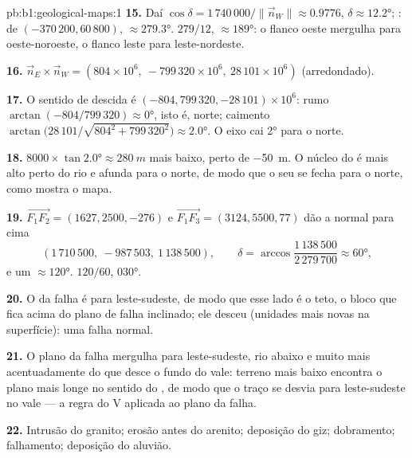 \begin{solution}{pb:b1:geological-maps:1}
\textbf{15.} Daí $\cos\delta = 1\,740\,000/\|\vec n_W\| \approx 0.9776$, $\delta
\approx \ang{12.2}$; :  de $(-370\,200, 60\,800)$,
$\approx \ang{279.3}$.  $279/12$,  $\approx \ang{189}$: o flanco oeste mergulha para oeste-noroeste, o flanco leste para leste-nordeste.

\textbf{16.} $\vec n_E \times \vec n_W = (804 \times 10^6,\ -799\,320 \times
10^6,\ 28\,101 \times 10^6)$ (arredondado).

\textbf{17.} O sentido de descida é $(-804, 799\,320, -28\,101) \times
10^6$: rumo $\arctan(-804/799\,320) \approx \ang{0}$, isto é, norte; caimento
$\arctan\bigl(28\,101/\sqrt{804^2 + 799\,320^2}\bigr) \approx \ang{2.0}$. O
eixo cai \ang{2} para o norte.

\textbf{18.} $8000 \times \tan\ang{2.0} \approx \qty{280}{m}$ mais baixo, perto de
\qty{-50}{m}. O núcleo do  é mais alto perto do rio e afunda para o norte, de modo que o seu  se fecha para o norte, como mostra o mapa.

\textbf{19.} $\overrightarrow{F_1F_2} = (1627, 2500, -276)$ e
$\overrightarrow{F_1F_3} = (3124, 5500, 77)$ dão a normal para cima
\[
  (1\,710\,500,\ -987\,503,\ 1\,138\,500), \qquad
  \delta = \arccos\frac{1\,138\,500}{2\,279\,700} \approx \ang{60},
\]
e um  $\approx \ang{120}$.  $120/60$, 
\ang{030}.

\textbf{20.} O  da falha é para leste-sudeste, de modo que esse lado é o teto, o bloco que fica acima do plano de falha inclinado; ele desceu (unidades mais novas na superfície): uma falha normal.

\textbf{21.} O plano da falha mergulha para leste-sudeste, rio abaixo e muito mais acentuadamente do que desce o fundo do vale: terreno mais baixo encontra o plano mais longe no sentido do , de modo que o traço se desvia para leste-sudeste no vale --- a regra do V aplicada ao plano da falha.

\textbf{22.} Intrusão do granito; erosão antes do arenito; deposição do giz; dobramento; falhamento; deposição do aluvião.


\end{solution}
